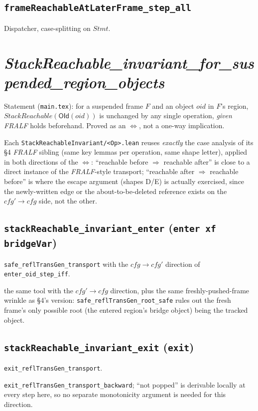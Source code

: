 \documentclass[11pt]{article}
\newcommand{\file}[1]{\texttt{#1}}
\newcommand{\op}[1]{\texttt{#1}}
\newcommand{\thm}[1]{\textbf{\texttt{#1}}}
\begin{document}
\subsection{\thm{frameReachableAtLaterFrame\_step\_all}}
Dispatcher, case-splitting on $Stmt$.

\section{\textit{StackReachable\_invariant\_for\_suspended\_region\_objects}}

Statement (\file{main.tex}): for a suspended frame $F$ and an object $oid$ in $F$'s region,
$\mathit{StackReachable}(\mathsf{OId}(oid))$ is unchanged by any single operation, \emph{given}
\textit{FRALF} holds beforehand. Proved as an $\iff$, not a one-way implication.

Each \file{StackReachableInvariant/<Op>.lean} reuses \emph{exactly} the case analysis of its
\S4 \textit{FRALF} sibling (same key lemmas per operation, same shape letter), applied in both
directions of the $\iff$: ``reachable before $\Rightarrow$ reachable after'' is close to a direct
instance of the \textit{FRALF}-style transport; ``reachable after $\Rightarrow$ reachable before''
is where the escape argument (shapes D/E) is actually exercised, since the newly-written edge or
the about-to-be-deleted reference exists on the $cfg' \to cfg$ side, not the other.

\subsection{\thm{stackReachable\_invariant\_enter} (\op{enter xf bridgeVar})}
\begin{description}[nosep]
  \item[Forward] \texttt{safe\_reflTransGen\_transport} with the $cfg \to cfg'$ direction of
    \texttt{enter\_oid\_step\_iff}.
  \item[Backward] the same tool with the $cfg' \to cfg$ direction, plus the same
    freshly-pushed-frame wrinkle as \S4's version: \texttt{safe\_reflTransGen\_root\_safe} rules
    out the fresh frame's only possible root (the entered region's bridge object) being the
    tracked object.
\end{description}

\subsection{\thm{stackReachable\_invariant\_exit} (\op{exit})}
\begin{description}[nosep]
  \item[Forward] \texttt{exit\_reflTransGen\_transport}.
  \item[Backward] \texttt{exit\_reflTransGen\_transport\_backward}; ``not popped'' is derivable
    locally at every step here, so no separate monotonicity argument is needed for this direction.
\end{description}
\end{document}
